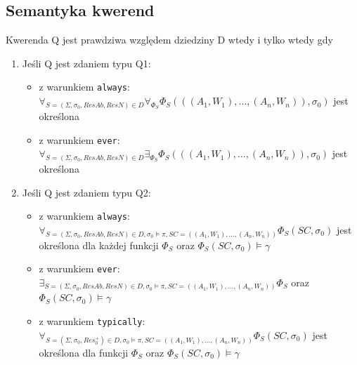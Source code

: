 \documentclass{article}
\begin{document}
\subsection{Semantyka kwerend}
Kwerenda Q jest prawdziwa względem dziedziny D wtedy i tylko wtedy gdy
\begin{enumerate}
	\item Jeśli Q jest zdaniem typu Q1:
	\begin{itemize}
		\item z warunkiem \texttt{always}: $\forall_{S=(\Sigma, \sigma_{0}, ResAb, ResN) \in D}\forall_{\Phi_{S}} \Phi_{S}(((A_{1}, W_{1}), \dots, (A_{n}, W_{n})), \sigma_{0})$ jest określona
		\item z warunkiem \texttt{ever}: 
		$\forall_{S=(\Sigma, \sigma_{0}, ResAb, ResN) \in D}\exists_{\Phi_{S}} \Phi_{S}(((A_{1}, W_{1}), \dots, (A_{n}, W_{n})), \sigma_{0})$ jest określona
	\end{itemize}
	\item Jeśli Q jest zdaniem typu Q2:
	\begin{itemize}
		\item z warunkiem \texttt{always}: 
		$\forall_{S=(\Sigma, \sigma_{0}, ResAb, ResN) \in D, \sigma_{0} \models \pi, SC=((A_{1}, W_{1}), \dots, (A_{n}, W_{n}))} \Phi_{S}(SC, \sigma_{0})$ jest określona dla każdej funkcji $\Phi_{S}$ oraz $\Phi_{S}(SC, \sigma_{0}) \models \gamma$
		\item z warunkiem \texttt{ever}:
		$\exists_{S=(\Sigma, \sigma_{0}, ResAb, ResN) \in D, \sigma_{0} \models \pi, SC=((A_{1}, W_{1}), \dots, (A_{n}, W_{n}))} \Phi_{S}$ oraz $\Phi_{S}(SC, \sigma_{0}) \models \gamma$
		\item z warunkiem \texttt{typically}:
		$\forall_{S=(\Sigma, \sigma_{0}, Res_{0}^{+}) \in D, \sigma_{0} \models \pi, SC=((A_{1}, W_{1}), \dots, (A_{n}, W_{n}))} \Phi_{S}(SC, \sigma_{0})$ jest określona dla funkcji $\Phi_{S}$ oraz $\Phi_{S}(SC, \sigma_{0}) \models \gamma$
	\end{itemize}
	

\end{enumerate}
\end{document}
